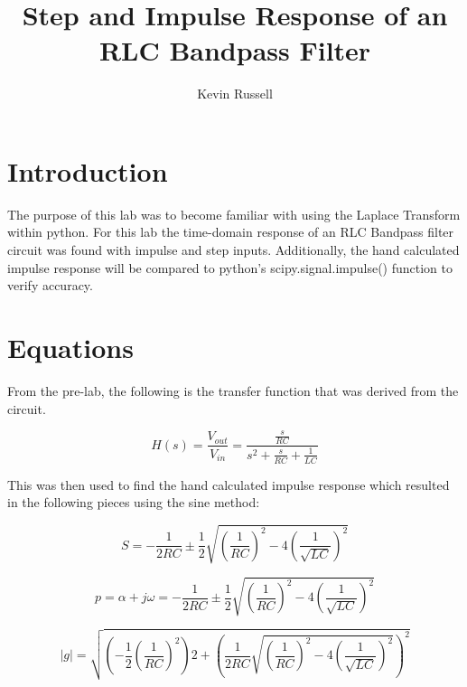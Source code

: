 \documentclass[12pt, titlepage]{article}
\author{Kevin Russell}
\title{Step and Impulse Response of an RLC Bandpass Filter}
\date{\parbox{\linewidth}{\centering%
  \experimentDate
  \endgraf\bigskip
  \className\ -- Section \sectionNumber\
}}
\begin{document}
 \newpage
	    \maketitle
    
    \newpage
        \tableofcontents
        
   \newpage
        \section{Introduction}
        The purpose of this lab was to become familiar with using the Laplace Transform within python.  For this lab the time-domain response of an RLC Bandpass filter circuit was found with impulse and step inputs. Additionally, the hand calculated impulse response will be compared to python's scipy.signal.impulse() function to verify accuracy.
        
        \section{Equations}
        From the pre-lab, the following is the transfer function that was derived from the circuit.
        
        \begin{equation}
            H(s)=\frac{V_{out}}{V_{in}}=\frac{\frac{s}{RC}}{s^2+\frac{s}{RC}+\frac{1}{LC}}
        \end{equation}
        
        This was then used to find the hand calculated impulse response which resulted in the following pieces using the sine method:
        
                \begin{equation}
                S=-\frac{1}{2RC}\pm \frac{1}{2}\sqrt{(\frac{1}{RC})^2-4(\frac{1}{\sqrt{LC}})^2}
                \end{equation}
                
                \begin{equation}
                    p=\alpha+j\omega=-\frac{1}{2RC}\pm \frac{1}{2}\sqrt{(\frac{1}{RC})^2-4(\frac{1}{\sqrt{LC}})^2}
                \end{equation}
                
                \begin{equation}
                    |g|=\sqrt{(-\frac{1}{2}(\frac{1}{RC})^2)2+(\frac{1}{2RC}\sqrt{(\frac{1}{RC})^2-4(\frac{1}{\sqrt{LC}})^2})^2}
                \end{equation}
                
\end{document}

